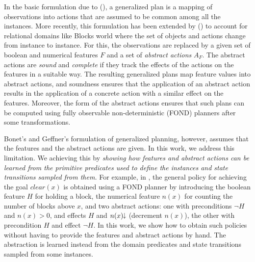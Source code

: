 \documentclass[letterpaper]{article} %
\newcommand{\Omit}[1]{}
\newcommand{\citeay}[1]{\citeauthor{#1} (\citeyear{#1})}
\newcommand{\mminus}{\hspace{-.05em}\raisebox{.15ex}{\footnotesize$\downarrow$}}
\begin{document}
In the basic formulation due  to \citeay{hu:generalized}, a generalized plan
is a mapping of observations into actions that are assumed to be common
among  all the instances. More recently, this formulation has been extended by
\citeay{bonet:ijcai2018} to account for relational domains like Blocks world  where the set of
objects and  actions change from instance to instance.
For this,   the observations  are replaced by  a given  set of boolean
and numerical features $F$ and a set of \emph{abstract actions} $A_F$.
The  abstract actions are  \emph{sound} and \emph{complete} if they track the
effects  of the actions on  the features in a suitable way.
The resulting generalized plans  map feature values into abstract actions, and soundness
ensures that the application  of an   abstract action  results in the application of
a concrete action with a similar  effect  on  the features. Moreover, the form of the abstract actions
ensures that such plans can be computed using fully observable non-deterministic (FOND) planners
after some transformations.

\Omit{
Abstract actions can increase or decrease numerical variables  $n$
associated with the numerical features (e.g., number of blocks above $x$), and while
increments  are transformed into deterministic propositional  effects $n > 0$ where $n > 0$ is
the negation of the proposition $n=0$, decrements  are  transformed  into
non-deterministic (disjunctive)  propositional effects $n > 0 \, | \, n=0$. 
}

Bonet's and Geffner's  formulation of generalized planning, however, assumes that the
features and the abstract actions are given.   In this work, we address this limitation.
We achieving this by  \emph{showing  how features and abstract actions  can be learned from
the primitive predicates used to define the instances and state transitions
sampled from them.} For example,  in \cite{bonet:ijcai2018}, 
the general policy for achieving the goal $clear(x)$  is obtained 
using a FOND planner by introducing the boolean feature $H$ for holding a block,
the numerical feature $n(x)$ for counting the  number of blocks above $x$, and  two   abstract  actions:
one  with  preconditions  $\neg H$ and $n(x) > 0$, and effects $H$ and $n(x)\mminus$
(decrement $n(x)$), the other with precondition $H$ and effect $\neg H$.
In this work, we show how  to obtain such  policies without
having to provide the  features and  abstract actions by hand.
The abstraction is learned instead from the domain predicates
and  state transitions sampled from some  instances. 
\end{document}
